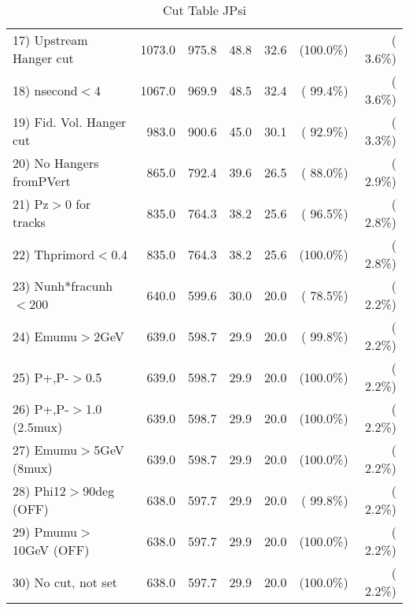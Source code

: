 \begin{table}[h!]
\begin{tabular}{||l||r|r|r|r|r|r||}
 17) Upstream Hanger cut  &       1073.0 &        975.8 &         48.8 &         32.6 & (100.0\%) & (  3.6\%) \\
 18) nsecond$<$4          &       1067.0 &        969.9 &         48.5 &         32.4 & ( 99.4\%) & (  3.6\%) \\
 19) Fid. Vol. Hanger cut &        983.0 &        900.6 &         45.0 &         30.1 & ( 92.9\%) & (  3.3\%) \\
 20) No Hangers fromPVert &        865.0 &        792.4 &         39.6 &         26.5 & ( 88.0\%) & (  2.9\%) \\
 21) Pz$>$0 for tracks    &        835.0 &        764.3 &         38.2 &         25.6 & ( 96.5\%) & (  2.8\%) \\
 22) Thprimord$<$0.4      &        835.0 &        764.3 &         38.2 &         25.6 & (100.0\%) & (  2.8\%) \\
 23) Nunh*fracunh$<$200   &        640.0 &        599.6 &         30.0 &         20.0 & ( 78.5\%) & (  2.2\%) \\
 24) Emumu$>$2GeV         &        639.0 &        598.7 &         29.9 &         20.0 & ( 99.8\%) & (  2.2\%) \\
 25) P+,P-$>$0.5          &        639.0 &        598.7 &         29.9 &         20.0 & (100.0\%) & (  2.2\%) \\
 26) P+,P-$>$1.0 (2.5mux) &        639.0 &        598.7 &         29.9 &         20.0 & (100.0\%) & (  2.2\%) \\
 27) Emumu$>$5GeV  (8mux) &        639.0 &        598.7 &         29.9 &         20.0 & (100.0\%) & (  2.2\%) \\
 28) Phi12$>$90deg  (OFF) &        638.0 &        597.7 &         29.9 &         20.0 & ( 99.8\%) & (  2.2\%) \\
 29) Pmumu$>$10GeV  (OFF) &        638.0 &        597.7 &         29.9 &         20.0 & (100.0\%) & (  2.2\%) \\
 30) No cut, not set      &        638.0 &        597.7 &         29.9 &         20.0 & (100.0\%) & (  2.2\%) \\
 \hline
 \hline
 \end{tabular}
 \caption{Cut Table  JPsi     }
 \label{tab-cutcohjpsi-mumu_cohrhop}
 \end{table}
